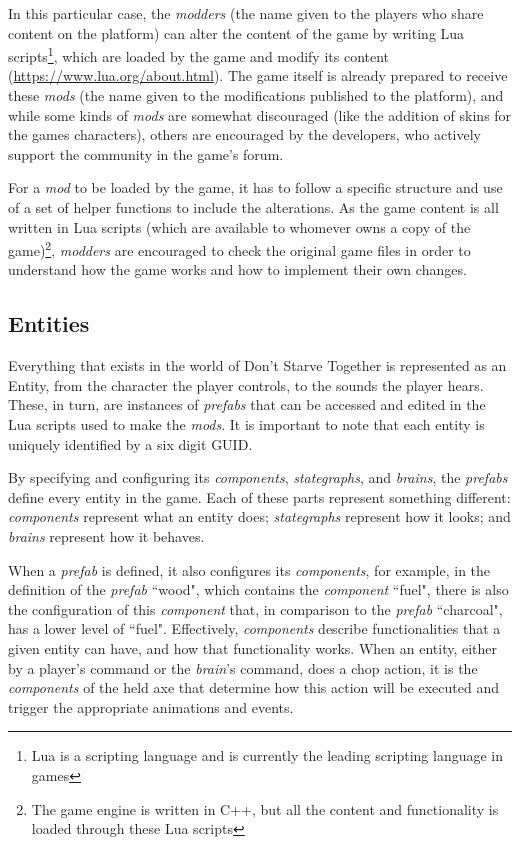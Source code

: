 In this particular case, the \textit{modders} (the name given to the players who share content on the platform) can alter the content of the game by writing Lua scripts\footnote{Lua is a scripting language and is currently the leading scripting language in games}, which are loaded by the game and modify its content (\href{https://www.lua.org/about.html}{https://www.lua.org/about.html}).
The game itself is already prepared to receive these \textit{mods} (the name given to the modifications published to the platform), and while some kinds of \textit{mods} are somewhat discouraged (like the addition of skins for the games characters), others are encouraged by the developers, who actively support the community in the game's forum.

For a \textit{mod} to be loaded by the game, it has to follow a specific structure and use of a set of helper functions to include the alterations.
As the game content is all written in Lua scripts (which are available to whomever owns a copy of the game)\footnote{The game engine is written in C++, but all the content and functionality is loaded through these Lua scripts}, \textit{modders} are encouraged to check the original game files in order to understand how the game works and how to implement their own changes.

\subsection{Entities}
\label{subsection:entities}

\noindent Everything that exists in the world of Don't Starve Together is represented as an Entity, from the character the player controls, to the sounds the player hears.
These, in turn, are instances of \textit{prefabs} that can be accessed and edited in the Lua scripts used to make the \textit{mods}.
It is important to note that each entity is uniquely identified by a six digit \ac{GUID}.

By specifying and configuring its \textit{components}, \textit{stategraphs}, and \textit{brains}, the \textit{prefabs} define every entity in the game.
Each of these parts represent something different: \textit{components} represent what an entity does; \textit{stategraphs} represent how it looks; and \textit{brains} represent how it behaves.

When a \textit{prefab} is defined, it also configures its \textit{components}, for example, in the definition of the \textit{prefab} ``wood", which contains the \textit{component} ``fuel", there is also the configuration of this \textit{component} that, in comparison to the \textit{prefab} ``charcoal", has a lower level of ``fuel".
Effectively, \textit{components} describe functionalities that a given entity can have, and how that functionality works.
When an entity, either by a player's command or the \textit{brain}'s command, does a chop action, it is the \textit{components} of the held axe that determine how this action will be executed and trigger the appropriate animations and events.

